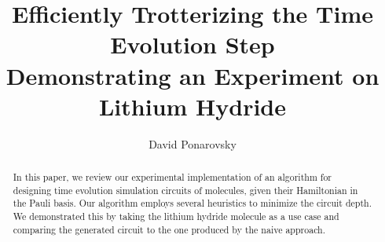 \documentclass{article}
\begin{document}
    
\title{
Efficiently Trotterizing the Time Evolution Step \\ Demonstrating an Experiment on Lithium Hydride
}
\author{David Ponarovsky}
\maketitle

\begin{abstract} 
In this paper, we review our experimental implementation of an algorithm for designing time evolution simulation circuits of molecules, given their Hamiltonian in the Pauli basis. Our algorithm employs several heuristics to minimize the circuit depth. We demonstrated this by taking the lithium hydride molecule as a use case and comparing the generated circuit to the one produced by the naive approach.
\end{abstract}
\end{document}
